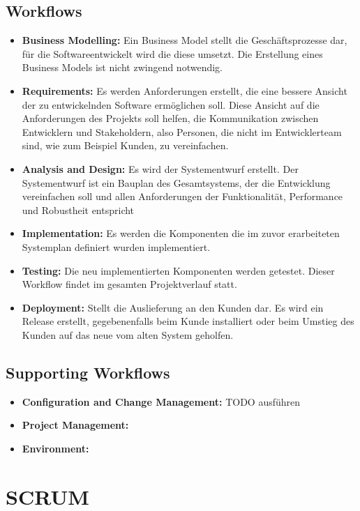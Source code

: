   \subsection{Workflows}
  \begin{itemize}
		\item \textbf{Business Modelling:} Ein Business Model stellt die Geschäftsprozesse dar, für die Softwareentwickelt wird die diese umsetzt. Die Erstellung eines Business Models ist nicht zwingend notwendig.
		\item \textbf{Requirements:} Es werden Anforderungen erstellt, die eine bessere Ansicht der zu entwickelnden Software ermöglichen soll. Diese Ansicht auf die Anforderungen des Projekts soll helfen, die Kommunikation zwischen Entwicklern und Stakeholdern, also Personen, die nicht im Entwicklerteam sind, wie zum Beispiel Kunden, zu vereinfachen.
		\item \textbf{Analysis and Design:} Es wird der Systementwurf erstellt. Der Systementwurf ist ein Bauplan des Gesamtsystems, der die Entwicklung vereinfachen soll und allen Anforderungen der Funktionalität, Performance und Robustheit entspricht
		\item \textbf{Implementation:} Es werden die Komponenten die im zuvor erarbeiteten Systemplan definiert wurden implementiert.
		\item \textbf{Testing:} Die neu implementierten Komponenten werden getestet. Dieser Workflow findet im gesamten Projektverlauf statt.
		\item \textbf{Deployment:} Stellt die Auslieferung an den Kunden dar. Es wird ein Release erstellt, gegebenenfalls beim Kunde installiert oder beim Umstieg des Kunden auf das neue vom alten System geholfen.
		\end{itemize}
		
		\subsection{Supporting Workflows}
		\begin{itemize} 
			\item \textbf{Configuration and Change Management:} TODO ausführen
			\item \textbf{Project Management:}
			\item \textbf{Environment:}
		\end{itemize}
		
	\section{SCRUM}
	
